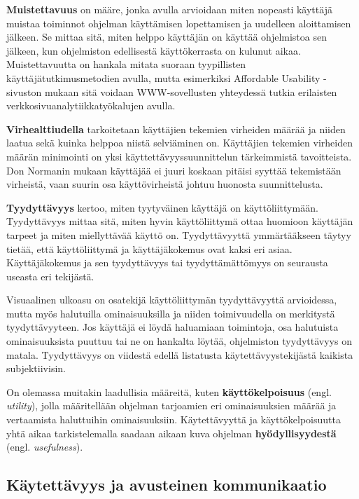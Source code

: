 \documentclass[utf8]{gradu3}
\begin{document}
\textbf{Muistettavuus} on määre, jonka avulla arvioidaan miten nopeasti käyttäjä muistaa toiminnot ohjelman käyttämisen lopettamisen ja uudelleen aloittamisen jälkeen. Se mittaa sitä, miten helppo käyttäjän on käyttää ohjelmistoa sen jälkeen, kun ohjelmiston edellisestä käyttökerrasta on kulunut aikaa. Muistettavuutta on hankala mitata suoraan tyypillisten käyttäjätutkimusmetodien avulla, mutta esimerkiksi Affordable Usability -sivuston \parencite[]{affordable-usability} mukaan sitä voidaan WWW-sovellusten yhteydessä tutkia erilaisten verkkosivuanalytiikkatyökalujen avulla.

\textbf{Virhealttiudella} tarkoitetaan käyttäjien tekemien virheiden määrää ja niiden laatua sekä kuinka helppoa niistä selviäminen on. Käyttäjien tekemien virheiden määrän minimointi on yksi käyttettävyyssuunnittelun tärkeimmistä tavoitteista. Don Normanin \parencite[]{norman-doet} mukaan  käyttäjää ei juuri koskaan pitäisi syyttää tekemistään virheistä, vaan suurin osa käyttövirheistä johtuu huonosta suunnittelusta.

\textbf{Tyydyttävyys} kertoo, miten tyytyväinen käyttäjä on käyttöliittymään. Tyydyttävyys mittaa sitä, miten hyvin käyttöliittymä ottaa huomioon käyttäjän tarpeet ja miten miellyttävää käyttö on. Tyydyttävyyttä ymmärtääkseen täytyy tietää, että käyttöliittymä ja käyttäjäkokemus ovat kaksi eri asiaa. Käyttäjäkokemus ja sen tyydyttävyys tai tyydyttämättömyys on seurausta useasta eri tekijästä. 

Visuaalinen ulkoasu on osatekijä käyttöliittymän tyydyttävyyttä arvioidessa, mutta myös halutuilla ominaisuuksilla ja niiden toimivuudella on merkitystä tyydyttävyyteen. Jos käyttäjä ei löydä haluamiaan toimintoja, osa halutuista ominaisuuksista puuttuu tai ne on hankalta löytää, ohjelmiston tyydyttävyys on matala. Tyydyttävyys on viidestä edellä listatusta käytettävyystekijästä kaikista subjektiivisin.

On olemassa muitakin laadullisia määreitä, kuten \textbf{käyttökelpoisuus} (engl. \textit{utility}), jolla määritellään ohjelman tarjoamien eri ominaisuuksien määrää ja vertaamista haluttuihin ominaisuuksiin. Käytettävyyttä ja käyttökelpoisuutta yhtä aikaa tarkistelemalla saadaan aikaan kuva ohjelman \textbf{hyödyllisyydestä} (engl. \textit{usefulness}). \parencite[]{usability-101}

\subsection{Käytettävyys ja avusteinen kommunikaatio}
\end{document}
